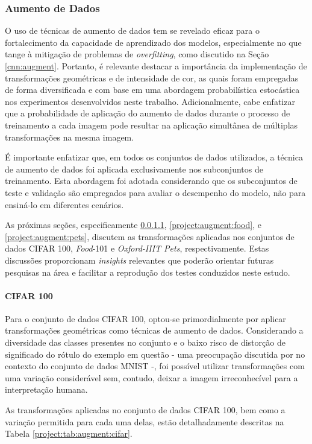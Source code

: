 \subsubsection{Aumento de Dados}
\label{project:augment}
O uso de técnicas de aumento de dados tem se revelado eficaz para o fortalecimento da capacidade de aprendizado dos modelos, especialmente no que tange à mitigação de problemas de \textit{overfitting}, como discutido na Seção \ref{cnn:augment}. Portanto, é relevante destacar a importância da implementação de transformações geométricas e de intensidade de cor, as quais foram empregadas de forma diversificada e com base em uma abordagem probabilística estocástica nos experimentos desenvolvidos neste trabalho. Adicionalmente, cabe enfatizar que a probabilidade de aplicação do aumento de dados durante o processo de treinamento a cada imagem pode resultar na aplicação simultânea de múltiplas transformações na mesma imagem.

É importante enfatizar que, em todos os conjuntos de dados utilizados, a técnica de aumento de dados foi aplicada exclusivamente nos subconjuntos de treinamento. Esta abordagem foi adotada considerando que os subconjuntos de teste e validação são empregados para avaliar o desempenho do modelo, não para ensiná-lo em diferentes cenários.

As próximas seções, especificamente \ref{project:augment:cifar}, \ref{project:augment:food}, e \ref{project:augment:pets}, discutem as transformações aplicadas nos conjuntos de dados CIFAR 100, \textit{Food}-101 e \textit{Oxford-IIIT Pets}, respectivamente. Estas discussões proporcionam \textit{insights} relevantes que poderão orientar futuras pesquisas na área e facilitar a reprodução dos testes conduzidos neste estudo.

\paragraph{CIFAR 100}
\label{project:augment:cifar}
Para o conjunto de dados CIFAR 100, optou-se primordialmente por aplicar transformações geométricas como técnicas de aumento de dados. Considerando a diversidade das classes presentes no conjunto e o baixo risco de distorção de significado do rótulo do exemplo em questão - uma preocupação discutida por \cite{Shorten2019ALearning} no contexto do conjunto de dados MNIST -, foi possível utilizar transformações com uma variação considerável sem, contudo, deixar a imagem irreconhecível para a interpretação humana.

As transformações aplicadas no conjunto de dados CIFAR 100, bem como a variação permitida para cada uma delas, estão detalhadamente descritas na Tabela \ref{project:tab:augment:cifar}.

